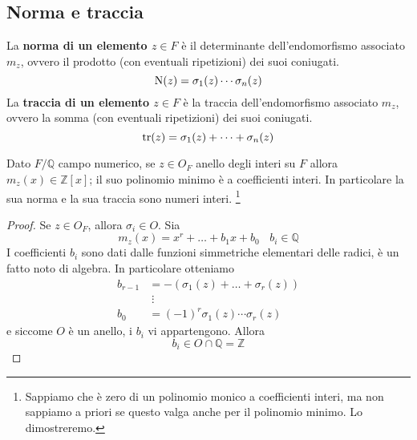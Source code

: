 \subsection{Norma e traccia}
\begin{definizione}
	La \textbf{norma di un elemento $z\in F$} è il determinante dell'endomorfismo associato $m_z$, ovvero il prodotto (con eventuali ripetizioni) dei suoi coniugati. 
	\begin{equation*}
	\operatorname{N}(z)=\sigma_1(z)\cdots\sigma_n(z)
	\end{equation*}
	La \textbf{traccia di un elemento $z\in F$} è la traccia dell'endomorfismo associato $m_z$, ovvero la somma (con eventuali ripetizioni) dei suoi coniugati.
	\begin{equation*}
	\operatorname{tr}(z)=\sigma_1(z)+\dots+\sigma_n(z)
	\end{equation*}
\end{definizione}
\begin{proposizione}
	Dato $F/\mathbb{Q}$ campo numerico, se $z\in O_F$ anello degli interi su $F$ allora $m_z(x)\in\mathbb{Z}[x]$; il suo polinomio minimo è a coefficienti interi. In particolare la sua norma e la sua traccia sono numeri interi. \footnote{Sappiamo che è zero di un polinomio monico a coefficienti interi, ma non sappiamo a priori se questo valga anche per il polinomio minimo. Lo dimostreremo.}
\end{proposizione}
\begin{proof}
	Se $z\in O_F$, allora $\sigma_i\in O$. Sia 
	\begin{equation*}
	m_z(x)=x^r+\dots+b_1x+b_0 \ \ \ \ b_i\in\mathbb{Q}
	\end{equation*}
	I coefficienti $b_i$ sono dati dalle funzioni simmetriche elementari delle radici, è un fatto noto di algebra. In particolare otteniamo
	\begin{equation*}
		\begin{array}{rl}
			b_{r-1}&=-\left(\sigma_1(z)+\dots+\sigma_r(z)\right)\\
			&\;\vdots\\
			b_0&=(-1)^r\sigma_1(z)\cdots\sigma_r(z)
		\end{array}
	\end{equation*}
	e siccome $O$ è un anello, i $b_i$ vi appartengono. Allora 
	\begin{equation*}
	b_i\in O\cap\mathbb{Q}=\mathbb{Z}
	\end{equation*}
\end{proof}




